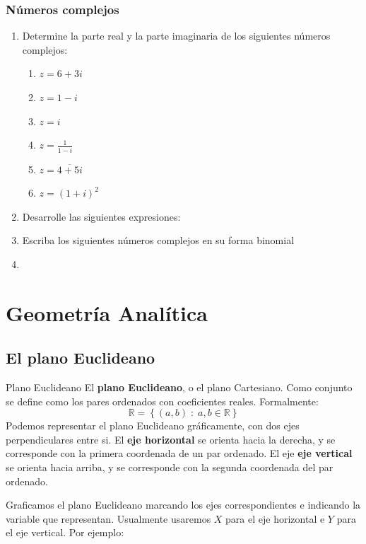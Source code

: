 \documentclass[11pt, twoside]{memoir}
\newcommand{\set}[1]{\left\lbrace #1 \right\rbrace}
\begin{document}
\subsection*{Números complejos}
\begin{enumerate}
    \item Determine la parte real y la parte imaginaria de los siguientes números complejos:
        \begin{multicols}{2}
        \begin{enumerate}
            \item \(z=6+3i\)
            \item \(z=1-i\)
            \item \(z=i\)
            \item \(z=\frac{1}{1-i}\)
            \item \(z=\overline{4+5i}\)
            \item \(z=(1+i)^2\)
        \end{enumerate}
    \end{multicols}
    \item Desarrolle las siguientes expresiones:
    \item Escriba los siguientes números complejos en su forma binomial
    \item 
\end{enumerate}


\chapter{Geometría Analítica}
\section{El plano Euclideano}
\begin{definition}{Plano Euclideano}
El \textbf{plano Euclideano}, o el plano Cartesiano. Como conjunto se define como los pares ordenados con coeficientes reales. Formalmente:
    \[\mathbb{R}=\set{(a,b)\;:\;a,b\in\mathbb{R}}\]
Podemos representar el plano Euclideano gráficamente, con dos ejes perpendiculares entre si. El \textbf{eje horizontal} se orienta hacia la derecha, y se corresponde con la primera coordenada de un par ordenado.
El eje \textbf{eje vertical} se orienta hacia arriba, y se corresponde con la segunda coordenada del par ordenado.

Graficamos el plano Euclideano marcando los ejes correspondientes e indicando la variable que representan. Usualmente usaremos \(X\) para el eje horizontal e \(Y\) para el eje vertical.
Por ejemplo:
\end{definition}
\end{document}

